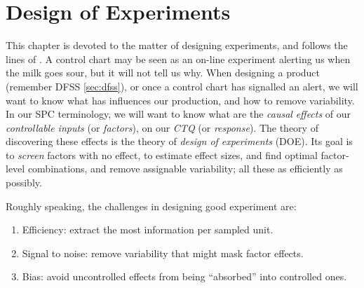 \chapter{Design of Experiments}

This chapter is devoted to the matter of designing experiments, and follows the lines of \cite{cox_theory_2000}.
A control chart may be seen as an on-line experiment alerting us when the milk goes sour, but it will not tell us why. 
When designing a product (remember DFSS \ref{sec:dfss}), or once a control chart has signalled an alert, we will want to know what has influences our production, and how to remove variability.
In our SPC terminology, we will want to know what are the \emph{causal} \emph{effects} of our \emph{controllable inputs} (or \emph{factors}), on our \emph{CTQ} (or \emph{response}). 
The theory of discovering these effects is the theory of \emph{design of experiments} (DOE).
Its goal is to \emph{screen} factors with no effect, to estimate effect sizes, and find optimal factor-level combinations, and remove assignable variability; all these as efficiently as possibly.



Roughly speaking, the challenges in designing good experiment are:
\begin{enumerate}
\item Efficiency: extract the most information per sampled unit.
\item Signal to noise: remove variability that might mask factor effects.
\item Bias: avoid uncontrolled effects from being ``absorbed'' into controlled ones.
\end{enumerate}





